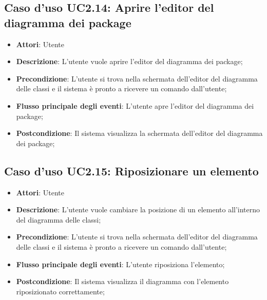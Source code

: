 \documentclass[../AnalisiDeiRequisiti.tex]{subfiles}
\begin{document}
		\subsection{Caso d'uso UC2.14: Aprire l'editor del diagramma dei package}
		\begin{itemize}
			\item \textbf{Attori}: Utente
			\item \textbf{Descrizione}: L'utente vuole aprire l'editor del diagramma dei package;
			\item \textbf{Precondizione}: L'utente si trova nella schermata dell'editor del diagramma delle classi e il sistema è pronto a ricevere un comando dall'utente;
			\item \textbf{Flusso principale degli eventi}: L'utente apre l'editor del diagramma dei package;
			\item \textbf{Postcondizione}: Il sistema visualizza la schermata dell'editor del diagramma dei package;
		\end{itemize}
		\subsection{Caso d'uso UC2.15: Riposizionare un elemento}
		\begin{itemize}
			\item \textbf{Attori}: Utente
			\item \textbf{Descrizione}: L'utente vuole cambiare la posizione di un elemento all'interno del diagramma delle classi;
			\item \textbf{Precondizione}: L'utente si trova nella schermata dell'editor del diagramma delle classi e il sistema è pronto a ricevere un comando dall'utente;
			\item \textbf{Flusso principale degli eventi}: L'utente riposiziona l'elemento;
			\item \textbf{Postcondizione}: Il sistema visualizza il diagramma con l'elemento riposizionato correttamente;
		\end{itemize}
\end{document}
